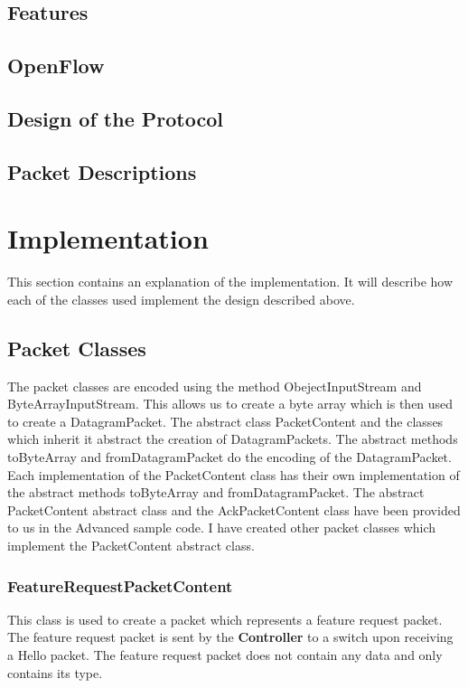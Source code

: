 \documentclass{article}
\begin{document}
\subsection{Features}

\subsection{OpenFlow}

\subsection{Design of the Protocol}

\subsection{Packet Descriptions}

\section{Implementation}
This section contains an explanation of the implementation. It will describe how
each of the classes used implement the design described above.

\subsection{Packet Classes}
The packet classes are encoded using the method ObejectInputStream and
ByteArrayInputStream. This allows us to create a byte array which is then used
to create a DatagramPacket. The abstract class PacketContent and the classes
which inherit it abstract the creation of DatagramPackets. The abstract
methods toByteArray and fromDatagramPacket do the encoding of the
DatagramPacket. Each implementation of the PacketContent class has their own
implementation of the abstract methods toByteArray and fromDatagramPacket. The
abstract PacketContent abstract class and the AckPacketContent class have been
provided to us in the Advanced sample code. I have created other packet classes
which implement the PacketContent abstract class.

\subsubsection{FeatureRequestPacketContent}
This class is used to create a packet which represents a feature request
packet. The feature request packet is sent by the \textbf{Controller} to a
switch upon receiving a Hello packet. The feature request packet does not
contain any data and only contains its type.
\end{document}
